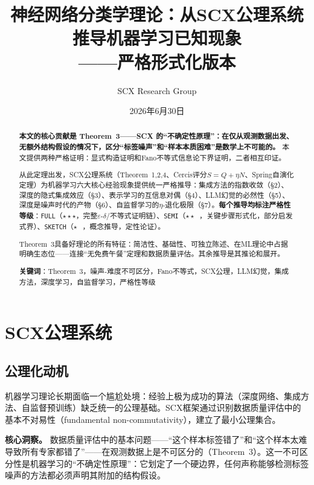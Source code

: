 \documentclass[12pt,a4paper]{ctexart}
\title{神经网络分类学理论：从SCX公理系统推导机器学习已知现象\\
       ——严格形式化版本}
\author{SCX Research Group}
\date{2026年6月30日}
\theoremstyle{definition}
\theoremstyle{remark}
\begin{document}
\maketitle

\begin{abstract}
\textbf{本文的核心贡献是 Theorem~3——SCX 的``不确定性原理''：在仅从观测数据出发、无额外结构假设的情况下，区分``标签噪声''和``样本本质困难''是数学上不可能的。} 本文提供两种严格证明：显式构造证明和Fano不等式信息论下界证明，二者相互印证。

从此定理出发，SCX公理系统（Theorem~1,2,4、Cercis评分$S = Q + \eta N$、Spring自演化定理）为机器学习六大核心经验现象提供统一严格推导：集成方法的指数收敛（\S2）、深度的隐式集成效应（\S3）、表示学习的互信息对偶（\S4）、LLM幻觉的必然性（\S5）、深度是噪声时代的产物（\S6）、自监督学习的$\eta$-退化极限（\S7）。\textbf{每个推导均标注严格性等级}：\texttt{FULL}（$\star\star\star$，完整$\varepsilon$-$\delta$/不等式证明链）、\texttt{SEMI}（$\star\star\;\;$，关键步骤形式化，部分启发式界）、\texttt{SKETCH}（$\star\;\;\,$，概念推导，定性论证）。

Theorem~3具备好理论的所有特征：简洁性、基础性、可独立陈述、在ML理论中占据明确生态位——连接``无免费午餐''定理和数据质量评估。其余推导是其推论和展开。

\bigskip
\noindent\textbf{关键词}：Theorem~3，噪声-难度不可区分，Fano不等式，SCX公理，LLM幻觉，集成方法，深度学习，自监督学习，严格性等级
\end{abstract}

\tableofcontents

\section{SCX公理系统}

\subsection{公理化动机}

机器学习理论长期面临一个尴尬处境：经验上极为成功的算法（深度网络、集成方法、自监督预训练）缺乏统一的公理基础。SCX框架通过识别数据质量评估中的基本不对易性（fundamental non-commutativity），建立了最小公理集合。

\textbf{核心洞察。} 数据质量评估中的基本问题——``这个样本标签错了''和``这个样本太难导致所有专家都错了''——在观测数据上是不可区分的（Theorem~3）。这一不可区分性是机器学习的``不确定性原理''：它划定了一个硬边界，任何声称能够检测标签噪声的方法都必须声明其附加的结构假设。
\end{document}
